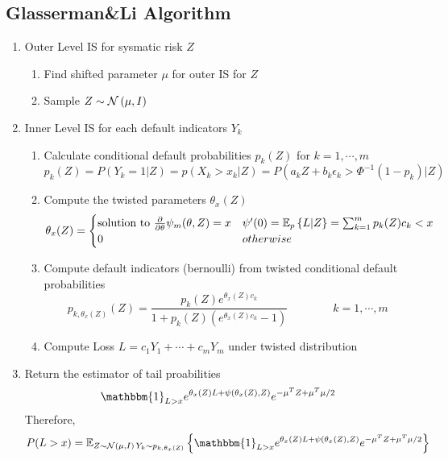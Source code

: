 \documentclass[11pt]{article}
\begin{document}
\newpage 

\subsection*{Glasserman\&Li Algorithm}

\begin{enumerate}
    \item Outer Level IS for sysmatic risk $Z$ 
    \begin{enumerate}
        \item Find shifted parameter $\mu$ for outer IS for $Z$
        \item Sample $Z \sim \normal{\mu, I}$ 
    \end{enumerate}
    \item Inner Level IS for each default indicators $Y_k$ 
    \begin{enumerate}
        \item Calculate conditional default probabilities $p_k(Z)$ for $k=1,\cdots, m$
        \[
            p_k(Z) = P(Y_k=1 | Z) = p(X_k > x_k | Z) = P(a_k Z + b_k \epsilon_k > \Phi^{-1}(1-p_k) | Z)
        \]
        \item Compute the twisted parameters $\theta_x(Z)$ 
        \[
            \theta_x(Z) = 
            \begin{cases}
                \text{solution to } \frac{\partial}{\partial \theta}\psi_m(\theta, Z) = x & \psi'(0) = \E[p]{L|Z} = \sum_{k=1}^m p_k(Z) c_k < x \\ 
                0 & otherwise \\ 
            \end{cases}    
        \]
        \item Compute default indicators (bernoulli) from twisted conditional default probabilities
        \[
            p_{k,\theta_x(Z)} (Z) = \frac{p_k(Z) e^{\theta_x(Z)c_k}}{1 + p_k(Z)(e^{\theta_x(Z)c_k} - 1)}
            \qquad 
            \qquad 
            k = 1,\cdots, m
        \]
        \item Compute Loss $L = c_1 Y_1 + \cdots + c_m Y_m$ under twisted distribution
    \end{enumerate}
    \item Return the estimator of tail proabilities
    \[
        \mathbbm{1}_{L>x} e^{\theta_x(Z)L + \psi(\theta_x(Z), Z)} e^{ -\mu^T Z + \mu^T \mu /2 }
    \]
    Therefore,
    \[
        P(L > x) = \E[Z\sim \normal{\mu, I} \, Y_k \sim p_{k, \theta_x(Z)}]{
            \mathbbm{1}_{L>x} e^{\theta_x(Z)L + \psi(\theta_x(Z), Z)} e^{ -\mu^T Z + \mu^T \mu /2 }
        }
    \]
\end{enumerate}
\end{document}
